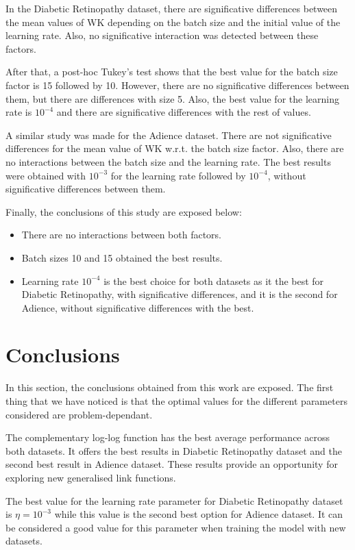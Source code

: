 \documentclass[10pt, a4paper, titlepage, twocolumn]{article}
\begin{document}
	In the Diabetic Retinopathy dataset, there are significative differences between the mean values of WK depending on the batch size and the initial value of the learning rate. Also, no significative interaction was detected between these factors.
	
	After that, a post-hoc Tukey's test shows that the best value for the batch size factor is 15 followed by 10. However, there are no significative differences between them, but there are differences with size 5. Also, the best value for the learning rate is $10^{-4}$ and there are significative differences with the rest of values.
	
	A similar study was made for the Adience dataset. There are not significative differences for the mean value of WK w.r.t. the batch size factor. Also, there are no interactions between the batch size and the learning rate. The best results were obtained with $10^{-3}$ for the learning rate followed by $10^{-4}$, without significative differences between them.
	
	Finally, the conclusions of this study are exposed below:
	\begin{itemize}
		\item There are no interactions between both factors.
		\item Batch sizes 10 and 15 obtained the best results.
		\item Learning rate $10^{-4}$ is the best choice for both datasets as it the best for Diabetic Retinopathy, with significative differences, and it is the second for Adience, without significative differences with the best. 
	\end{itemize}
	
	\section{Conclusions}
	\label{sect:conclusions}
	In this section, the conclusions obtained from this work are exposed. The first thing that we have noticed is that the optimal values for the different parameters considered are problem-dependant. 
	
	The complementary log-log function has the best average performance across both datasets. It offers the best results in Diabetic Retinopathy dataset and the second best result in Adience dataset. These results provide an opportunity for exploring new generalised link functions.
	
	The best value for the learning rate parameter for  Diabetic Retinopathy dataset is $\eta = 10^{-3}$ while this value is the second best option for Adience dataset. It can be considered a good value for this parameter when training the model with new datasets.
	
\end{document}
